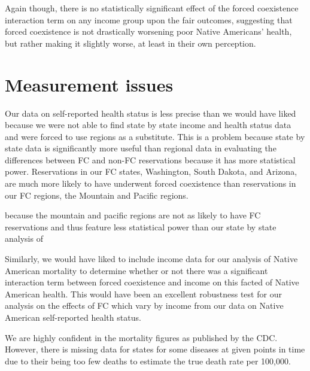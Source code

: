 \documentclass[12pt]{article}
\begin{document}
Again though, there is no statistically significant effect of the forced coexistence interaction term on any income group upon the fair outcomes, suggesting that forced coexistence is not drastically worsening poor Native Americans’ health, but rather making it slightly worse, at least in their own perception. 




\section{Measurement issues}

Our data on self-reported health status is less precise than we would have liked because we were not able to find state by state income and health status data and were forced to use regions as a substitute.  This is a problem because state by state data is significantly more useful than regional data in evaluating the differences between FC and non-FC reservations because it has more statistical power.  Reservations in our FC states, Washington, South Dakota, and Arizona, are much more likely to have underwent forced coexistence than reservations in our FC regions, the Mountain and Pacific regions.

because the mountain and pacific regions are not as likely to have FC reservations and thus feature less statistical power than our state by state analysis of 

Similarly, we would have liked to include income data for our analysis of Native American mortality to  determine whether or not there was a significant interaction term between forced coexistence and income on this facted of Native American health.  This would have been an excellent robustness test for our analysis on the effects of FC which vary by income from our data on Native American self-reported health status.  

We are highly confident in the mortality figures as published by the CDC.  However, there is missing data for states for some diseases at given points in time due to their being too few deaths to estimate the true death rate per 100,000.
\end{document}
